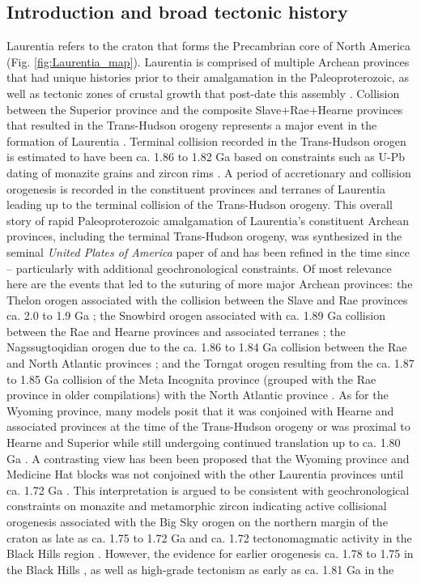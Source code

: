 \documentclass[11pt,letterpaper]{article}
\begin{document}
\subsection{Introduction and broad tectonic history}

Laurentia refers to the craton that forms the Precambrian core of North America (Fig. \ref{fig:Laurentia_map}). Laurentia is comprised of multiple Archean provinces that had unique histories prior to their amalgamation in the Paleoproterozoic, as well as tectonic zones of crustal growth that post-date this assembly \citep{Hoffman1989a, Whitmeyer2007a}. Collision between the Superior province and the composite Slave+Rae+Hearne provinces that resulted in the Trans-Hudson orogeny represents a major event in the formation of Laurentia \citep{Corrigan2009a}. Terminal collision recorded in the Trans-Hudson orogen is estimated to have been ca. 1.86 to 1.82 Ga based on constraints such as U-Pb dating of monazite grains and zircon rims \citep[e.g.]{Skipton2016a, Weller2017a}. A period of accretionary and collision orogenesis is recorded in the constituent provinces and terranes of Laurentia leading up to the terminal collision of the Trans-Hudson orogeny. This overall story of rapid Paleoproterozoic amalgamation of Laurentia's constituent Archean provinces, including the terminal Trans-Hudson orogeny, was synthesized in the seminal \textit{United Plates of America} paper of \citet{Hoffman1988a} and has been refined in the time since -- particularly with additional geochronological constraints. Of most relevance here are the events that led to the suturing of more major Archean provinces: the Thelon orogen associated with the collision between the Slave and Rae provinces ca. 2.0 to 1.9 Ga \citep{Hoffman1989a}; the Snowbird orogen associated with ca. 1.89 Ga collision between the Rae and Hearne provinces and associated terranes \citep{Berman2007a}; the Nagssugtoqidian orogen due to the ca. 1.86 to 1.84 Ga collision between the Rae and North Atlantic provinces \citep{St-Onge2009a}; and the Torngat orogen resulting from the ca. 1.87 to 1.85 Ga collision of the Meta Incognita province (grouped with the Rae province in older compilations) with the North Atlantic province \citep{St-Onge2009a}. As for the Wyoming province, many models posit that it was conjoined with Hearne and associated provinces at the time of the Trans-Hudson orogeny \citep[e.g.][]{St-Onge2009a, Pehrsson2015a} or was proximal to Hearne and Superior while still undergoing continued translation up to ca. 1.80 Ga \citep{Whitmeyer2007a}. A contrasting view has been been proposed that the Wyoming province and Medicine Hat blocks was not conjoined with the other Laurentia provinces until ca. 1.72 Ga \citep{Kilian2016b}. This interpretation is argued to be consistent with geochronological constraints on monazite and metamorphic zircon indicating active collisional orogenesis associated with the Big Sky orogen on the northern margin of the craton as late as ca. 1.75 to 1.72 Ga \citep{Condit2015a} and ca. 1.72 tectonomagmatic activity in the Black Hills region \citep{Redden1990a}. However, the evidence for earlier orogenesis ca. 1.78 to 1.75 in the Black Hills \citep{Dahl1999a,Hrncir2017a}, as well as high-grade tectonism as early as ca. 1.81 Ga in the 
\end{document}
